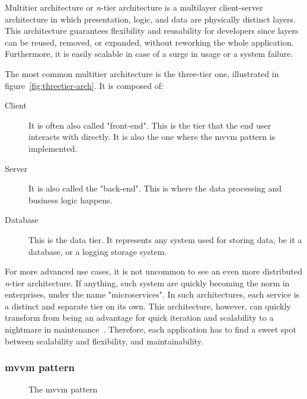 Multitier architecture or \emph{n}-tier architecture is a multilayer client-server architecture in which presentation, logic, and data are physically distinct layers. This architecture guarantees flexibility and reusability for developers since layers can be reused, removed, or expanded, without reworking the whole application.
Furthermore, it is easily scalable in case of a surge in usage or a system failure.

The most common multitier architecture is the three-tier one, illustrated in figure~\ref{fig:threetier-arch}. It is composed of:
\begin{description}
  \item[Client] It is often also called "front-end".
        This is the tier that the end user interacts with directly.
        It is also the one where the \acrshort{mvvm} pattern is implemented.
  \item[Server] It is also called the "back-end".
        This is where the data processing and business logic happens.
  \item[Database] This is the data tier.
        It represents any system used for storing data, be it a database, or a logging storage system.
\end{description}

For more advanced use cases, it is not uncommon to see an even more distributed \emph{n}-tier architecture.
If anything, such system are quickly becoming the norm in enterprises, under the name "microservices".
In such architectures, each service is a distinct and separate tier on its own.
This architecture, however, can quickly transform from being an advantage for quick iteration and scalability to a nightmare in maintenance~\autocite{pautasso_microservices_2017}.
Therefore, each application has to find a sweet spot between scalability and flexibility, and maintainability.

\subsubsection{\acrshort{mvvm} pattern}

\begin{figure}[H]
  \centerfloat

  \caption{The \acrshort{mvvm} pattern}
  \label{fig:mvvm-arch}
\end{figure}

